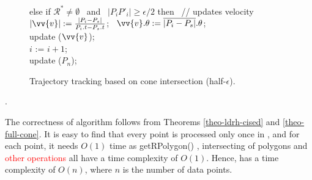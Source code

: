 {\begin{figure}[tb!]
\begin{center}
{\begin{minipage}{3.3in}
{					\icc \>\hspace{3ex} else if $\mathcal{R}^* \ne \emptyset$ ~and~ $|P_iP'_i| \ge \epsilon/2 $ then   ~// updates velocity \\
					\icc \>\hspace{7ex}    $|\vv{v}|:=\frac{|P_i-P_s|}{P_i.t-P_s.t}$; ~$\vv{v}.\theta:=\overline{|P_i-P_s|}.\theta$; \\
					\icc \>\hspace{7ex}    update ($\vv{v}$); \\
					\icc \>\hspace{3ex} $i$ := $i +1$;	\\
					\icc \>\hspace{0ex} update ($P_{n}$); 
				}
				\vspace{-2ex}
				\myhrule
			\end{minipage}
		}
	\end{center}
	\vspace{-1ex}
	\caption{\small Trajectory tracking based on cone intersection (half-$\epsilon$).}
	\label{alg:citt-s-half}
	\vspace{-1ex}
\end{figure}
}

\begin{example}
	\todo.
\end{example}


The correctness of algorithm \citt follows from Theorems \ref{theo-ldrh-cised} and \ref{theo-full-cone}.
It is easy to find that every point is processed only once in \citt, and for each point, it needs $O(1)$ time as getRPolygon() \cite{Lin:Cised}, intersecting of polygons \cite{Lin:Cised} and \textcolor{red}{other operations} all have a time complexity of $O(1)$. Hence, \citt has a time complexity of $O(n)$, where $n$ is the number of data points.






